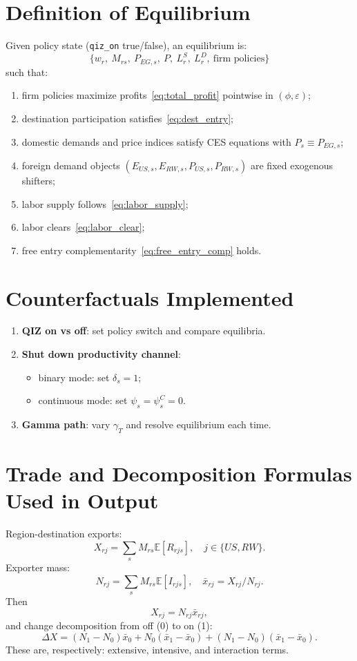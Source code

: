 \documentclass[11pt]{article}
\begin{document}
\section{Definition of Equilibrium}
Given policy state (\texttt{qiz\_on} true/false), an equilibrium is:
\[
\{w_r,\ M_{rs},\ P_{EG,s},\ P,\ L^S_r,\ L^D_r,\ \text{firm policies}\}
\]
such that:
\begin{enumerate}
    \item firm policies maximize profits~\eqref{eq:total_profit} pointwise in $(\phi,\varepsilon)$;
    \item destination participation satisfies~\eqref{eq:dest_entry};
    \item domestic demands and price indices satisfy CES equations with $P_s\equiv P_{EG,s}$;
    \item foreign demand objects $(E_{US,s},E_{RW,s},P_{US,s},P_{RW,s})$ are fixed exogenous shifters;
    \item labor supply follows~\eqref{eq:labor_supply};
    \item labor clears~\eqref{eq:labor_clear};
    \item free entry complementarity~\eqref{eq:free_entry_comp} holds.
\end{enumerate}

\section{Counterfactuals Implemented}
\begin{enumerate}
    \item \textbf{QIZ on vs off}: set policy switch and compare equilibria.
    \item \textbf{Shut down productivity channel}:
    \begin{itemize}
        \item binary mode: set $\delta_s=1$;
        \item continuous mode: set $\psi_s=\psi^C_s=0$.
    \end{itemize}
    \item \textbf{Gamma path}: vary $\gamma_T$ and resolve equilibrium each time.
\end{enumerate}

\section{Trade and Decomposition Formulas Used in Output}
Region-destination exports:
\[
X_{rj}=\sum_s M_{rs}\mathbb E[R_{rjs}],\quad j\in\{US,RW\}.
\]
Exporter mass:
\[
N_{rj}=\sum_s M_{rs}\mathbb E[I_{rjs}],
\quad
\bar x_{rj}=X_{rj}/N_{rj}.
\]
Then
\[
X_{rj}=N_{rj}\bar x_{rj},
\]
and change decomposition from off (0) to on (1):
\begin{equation}
\Delta X
=
(N_1-N_0)\bar x_0
+N_0(\bar x_1-\bar x_0)
+(N_1-N_0)(\bar x_1-\bar x_0).
\end{equation}
These are, respectively: extensive, intensive, and interaction terms.
\end{document}
